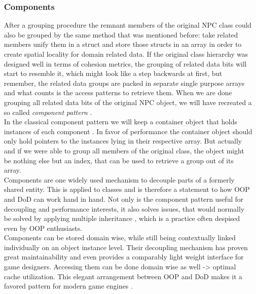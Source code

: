 \subsubsection{Components}
After a grouping procedure the remnant members of the original NPC class could also be grouped by the same method that was mentioned before: take related members unify them in a struct and store those structs in an array in order to create spatial locality for domain related data. If the original class hierarchy was designed well in terms of cohesion metrics, the grouping of related data bits will start to resemble it, which might look like a step backwards at first, but remember, the related data groups are packed in separate single purpose arrays and what counts is the access patterns to retrieve them. When we are done grouping all related data bits of the original NPC object, we will have recreated a so called \textit{component pattern} .\\
In the classical component pattern we will keep a container object that holds instances of each component . In favor of performance the container object should only hold pointers to the instances lying in their respective array. But actually and if we were able to group all members of the original class, the object might be nothing else but an index, that can be used to retrieve a group out of its array.\\
Components are one widely used mechanism to decouple parts of a formerly shared entity. This is applied to classes and is therefore a statement to how OOP and DoD can work hand in hand. Not only is the component pattern useful for decoupling and performance interests, it also solves issues, that would normally be solved by applying multiple inheritance , which is a practice often despised even by OOP enthusiasts.\\
Components can be stored domain wise, while still being contextually linked individually on an object instance level. Their decoupling mechanism has proven great maintainability and even provides a comparably light weight interface for game designers. Accessing them can be done domain wise as well -> optimal cache utilization. This elegant arrangement between OOP and DoD makes it a favored pattern for modern game engines .
